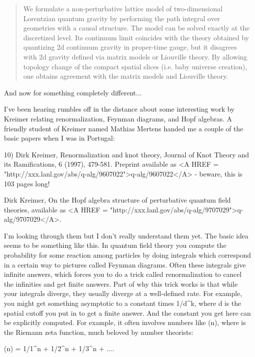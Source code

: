 \begin{quote}
	We formulate a non-perturbative lattice model of
   	two-dimensional Lorentzian quantum gravity by performing the
	path integral over geometries with a causal structure. The
	model can be solved exactly at the discretized level. Its
	continuum limit coincides with the theory obtained by
	quantizing 2d continuum gravity in proper-time gauge, but it
	disagrees with 2d gravity defined via matrix models or
	Liouville theory. By allowing topology change of the compact
	spatial slices (i.e. baby universe creation), one obtains
	agreement with the matrix models and Liouville theory.
\end{quote}
And now for something completely different...

I've been hearing rumbles off in the distance about some interesting
work by Kreimer relating renormalization, Feynman diagrams, and Hopf
algebras.  A friendly student of Kreimer named Mathias Mertens
handed me a couple of the basic papers when I was in Portugal:

10) Dirk Kreimer, Renormalization and knot theory, Journal of Knot
Theory and its Ramifications, 6 (1997), 479-581.  Preprint available as
<A HREF = "http://xxx.lanl.gov/abs/q-alg/9607022">q-alg/9607022</A> -
beware, this is 103 pages long!

Dirk Kreimer, On the Hopf algebra structure of perturbative quantum
field theories, available as <A HREF =
"http://xxx.lanl.gov/abs/q-alg/9707029">q-alg/9707029</A>.

I'm looking through them but I don't really understand them yet.  
The basic idea seems to be something like this.  In quantum field
theory you compute the probability for some reaction among particles
by doing integrals which correspond in a certain way to pictures
called Feynman diagrams.  Often these integrals give infinite answers,
which forces you to do a trick called renormalization to cancel the
infinities and get finite answers.  Part of why this trick works is
that while your integrals diverge, they usually diverge at a well-defined 
rate.  For example, you might get something asymptotic to a constant 
times 1/d^k, where d is the spatial cutoff you put in to get a finite 
answer.  And the constant you get here can be explicitly computed.  
For example, it often involves numbers like \zeta (n), where \zeta  is the 
Riemann zeta function, much beloved by number theorists:

           \zeta (n) = 1/1^{n} + 1/2^{n} + 1/3^{n} + ....

